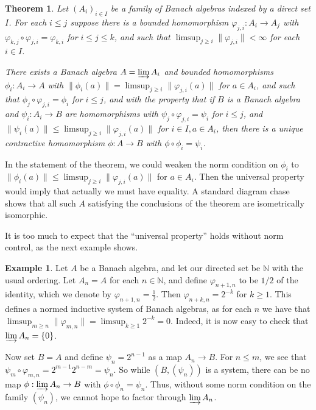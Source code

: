\documentclass[a4paper,11pt]{article}
\newcommand{\indlim}{\varinjlim}
\newtheorem{theorem}[lemma]{Theorem}
\theoremstyle{definition}
\newtheorem{example}[lemma]{Example}
\begin{document}
\begin{theorem}
Let $(A_i)_{i\in I}$ be a family of Banach algebras indexed by a direct set $I$.  For each
$i\leq j$ suppose there is a bounded homomorphism $\varphi_{j,i}:A_i\rightarrow A_j$ with
$\varphi_{k,j} \circ \varphi_{j,i} = \varphi_{k,i}$ for $i\leq j\leq k$, and such that
$\limsup_{j\geq i} \|\varphi_{j,i}\| < \infty$ for each $i\in I$.  

There exists a Banach algebra $A=\indlim A_i$ and bounded homomorphisms $\phi_i:A_i\rightarrow
A$ with $\|\phi_i(a)\| = \limsup_{j\geq i} \|\varphi_{j,i}(a)\|$ for $a\in A_i$, and such that
$\phi_j \circ \varphi_{j,i} = \phi_i$ for $i\leq j$,
and with the property that if $B$ is a Banach algebra and
$\psi_i:A_i\rightarrow B$ are homomorphisms with $\psi_j \circ \varphi_{j,i} = \psi_i$ for
$i\leq j$, and
$\|\psi_i(a)\| \leq \limsup_{j\geq i} \|\varphi_{j,i}(a)\|$ for $i\in I, a\in A_i$, then there is
a unique contractive homomorphism $\phi:A\rightarrow B$ with $\phi\circ\phi_i = \psi_i$.
\end{theorem}

In the statement of the theorem, we could weaken the norm condition on $\phi_i$ to
$\|\phi_i(a)\| \leq \limsup_{j\geq i} \|\varphi_{j,i}(a)\|$ for $a\in A_i$.  Then the universal
property would imply that actually we must have equality.  A standard diagram chase shows that all
such $A$ satisfying the conclusions of the theorem are isometrically isomorphic.

It is too much to expect that the ``universal property'' holds without norm control, as the next
example shows.

\begin{example}\label{ex:one}
Let $A$ be a Banach algebra, and let our directed set be $\mathbb N$ with the usual ordering.
Let $A_n = A$ for each $n\in\mathbb N$, and define $\varphi_{n+1,n}$ to be $1/2$ of the identity,
which we denote by $\varphi_{n+1,n} = \frac12$.  Then $\varphi_{n+k,n} = 2^{-k}$ for $k\geq 1$.
This defines a normed inductive system of Banach algebras, as for each $n$ we have that
$\limsup_{m\geq n} \|\varphi_{m,n}\| = \limsup_{k\geq 1} 2^{-k} = 0$.  Indeed, it is now easy to
check that $\indlim A_n = \{0\}$.

Now set $B=A$ and define $\psi_n = 2^{n-1}$ as a map $A_n\rightarrow B$.  For $n\leq m$, we see that
$\psi_m \circ \varphi_{m,n} = 2^{m-1} 2^{n-m} = \psi_n$.  So while $(B, (\psi_n))$ is a system,
there can be no map $\phi:\indlim A_n\rightarrow B$ with $\phi\circ\phi_n = \psi_n$.  Thus, without
some norm condition on the family $(\psi_n)$, we cannot hope to factor through $\indlim A_n$.
\end{example}
\end{document}
